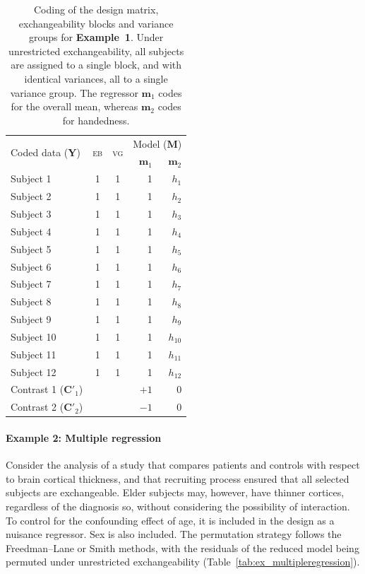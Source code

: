 \begin{table}[!t]
\caption[Coding for Example 1]{Coding of the design matrix, exchangeability blocks and variance groups for \textbf{Example~1}. Under unrestricted exchangeability, all subjects are assigned to a single block, and with identical variances, all to a single variance group. The regressor $\mathbf{m}_1$ codes for the overall mean, whereas $\mathbf{m}_2$ codes for handedness.}
\begin{center}
{\small
\begin{tabular}{@{}lccrr@{}}
\toprule
\multirow{2}{*}{\vspace*{-1.7mm}Coded data ($\mathbf{Y}$)} & \multirow{2}{*}{\vspace*{-1.7mm}\textsc{eb}} & \multirow{2}{*}{\vspace*{-1.7mm}\textsc{vg}} & \multicolumn{2}{c}{Model ($\mathbf{M}$)\hspace*{-2mm}}\\
\cmidrule(l){4-5}
& & &  $\mathbf{m}_1$ & $\mathbf{m}_2$\\
\midrule
Subject 1  & 1 & 1 & 1 & $h_{1}$\\
Subject 2  & 1 & 1 & 1 & $h_{2}$\\
Subject 3  & 1 & 1 & 1 & $h_{3}$\\
Subject 4  & 1 & 1 & 1 & $h_{4}$\\
Subject 5  & 1 & 1 & 1 & $h_{5}$\\
Subject 6  & 1 & 1 & 1 & $h_{6}$\\
Subject 7  & 1 & 1 & 1 & $h_{7}$\\
Subject 8  & 1 & 1 & 1 & $h_{8}$\\
Subject 9  & 1 & 1 & 1 & $h_{9}$\\
Subject 10 & 1 & 1 & 1 & $h_{10}$\\
Subject 11 & 1 & 1 & 1 & $h_{11}$\\
Subject 12 & 1 & 1 & 1 & $h_{12}$\\
\midrule
Contrast 1 ($\mathbf{C}'_1$) & & & $+1$ & 0\\
Contrast 2 ($\mathbf{C}'_2$) & & & $-1$ & 0\\
\bottomrule
\end{tabular}}
\end{center}
\label{tab:ex_meaneffect}
\end{table}

\paragraph{Example 2: Multiple regression} Consider the analysis of a study that compares patients and controls with respect to brain cortical thickness, and that recruiting process ensured that all selected subjects are exchangeable. Elder subjects may, however, have thinner cortices, regardless of the diagnosis so, without considering the possibility of interaction. To control for the confounding effect of age, it is included in the design as a nuisance regressor. Sex is also included. The permutation strategy follows the Freedman--Lane or Smith methods, with the residuals of the reduced model being permuted under unrestricted exchangeability (Table~\ref{tab:ex_multipleregression}).

